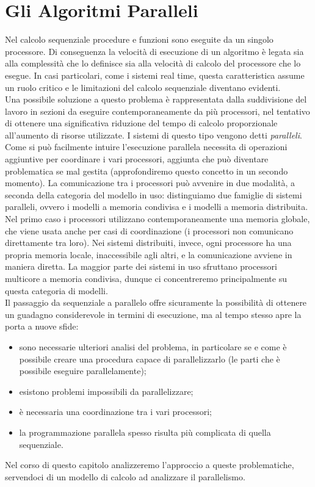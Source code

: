 \chapter{Gli Algoritmi Paralleli}
Nel calcolo sequenziale procedure e funzioni sono eseguite da un singolo processore. Di conseguenza la velocità di esecuzione di un algoritmo è legata sia alla complessità che lo definisce sia alla velocità di calcolo del processore che lo esegue. In casi particolari, come i sistemi real time, questa caratteristica assume un ruolo critico e le limitazioni del calcolo sequenziale diventano evidenti.\\
Una possibile soluzione a questo problema è rappresentata dalla suddivisione del lavoro in sezioni da eseguire contemporaneamente da più processori, nel tentativo di ottenere una significativa riduzione del tempo di calcolo proporzionale all'aumento di risorse utilizzate. I sistemi di questo tipo vengono detti \textit{paralleli}.\\
Come si può facilmente intuire l'esecuzione parallela necessita di operazioni aggiuntive per coordinare i vari processori, aggiunta che può diventare problematica se mal gestita (approfondiremo questo concetto in un secondo momento). La comunicazione tra i processori può avvenire in due modalità, a seconda della categoria del modello in uso: distinguiamo due famiglie di sistemi paralleli, ovvero i modelli a memoria condivisa e i modelli a memoria distribuita. Nel primo caso i processori utilizzano contemporaneamente una memoria globale, che viene usata anche per casi di coordinazione (i processori non comunicano direttamente tra loro). Nei sistemi distribuiti, invece, ogni processore ha una propria memoria locale, inaccessibile agli altri, e la comunicazione avviene in maniera diretta. La maggior parte dei sistemi in uso sfruttano processori multicore a memoria condivisa, dunque ci concentreremo principalmente su questa categoria di modelli.\\
\newpage
\noindent Il passaggio da sequenziale a parallelo offre sicuramente la possibilità di ottenere un guadagno considerevole in termini di esecuzione, ma al tempo stesso apre la porta a nuove sfide: 
\begin{itemize}
\item{sono necessarie ulteriori analisi del problema, in particolare se e come è possibile creare una procedura capace di parallelizzarlo (le parti che è possibile eseguire parallelamente);}
\item{esistono problemi impossibili da parallelizzare;}
\item{è necessaria una coordinazione tra i vari processori;}
\item{la programmazione parallela spesso risulta più complicata di quella sequenziale.}
\end{itemize}
Nel corso di questo capitolo analizzeremo l'approccio a queste problematiche, servendoci di un modello di calcolo ad analizzare il parallelismo.
